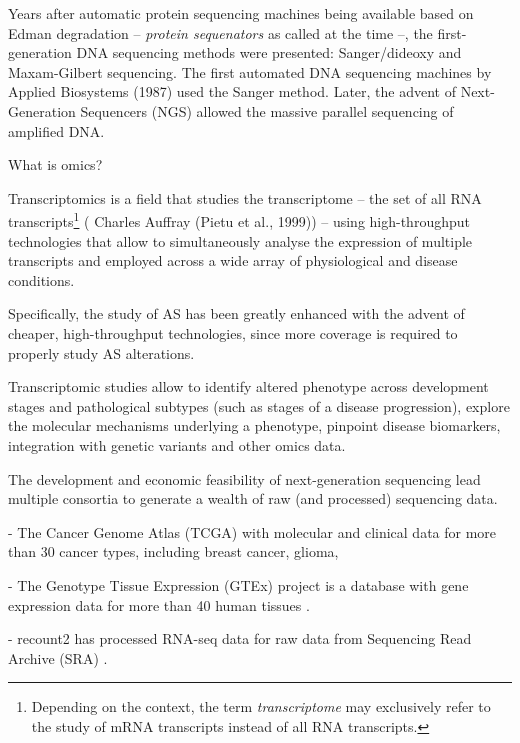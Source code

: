 Years after automatic protein sequencing machines being available based on Edman degradation -- \emph{protein sequenators} as called at the time --, the first-generation DNA sequencing methods were presented: Sanger/dideoxy and Maxam-Gilbert sequencing. %
The first automated DNA sequencing machines by Applied Biosystems (1987) used the Sanger method. Later, the advent of Next-Generation Sequencers (NGS) allowed the massive parallel sequencing of amplified DNA.


What is omics? %

Transcriptomics is a field that studies the transcriptome -- the set of all RNA transcripts\footnote{Depending on the context, the term \emph{transcriptome} may exclusively refer to the study of mRNA transcripts instead of all RNA transcripts.} ( Charles Auffray (Pietu et al., 1999)) -- using high-throughput technologies that allow to simultaneously analyse the expression of multiple transcripts and employed across a wide array of physiological and disease conditions.

Specifically, the study of AS has been greatly enhanced with the advent of cheaper, high-throughput technologies, since more coverage is required to properly study AS alterations.

Transcriptomic studies allow to identify altered phenotype across development stages and pathological subtypes (such as stages of a disease progression), explore the molecular mechanisms underlying a phenotype, pinpoint disease biomarkers, integration with genetic variants and other omics data.

The development and economic feasibility of next-generation sequencing lead multiple consortia to generate a wealth of raw (and processed) sequencing data.

- The Cancer Genome Atlas (TCGA) with molecular and clinical data for more than 30 cancer types, including breast cancer, glioma, 

- The Genotype Tissue Expression (GTEx) project is a database with gene expression data for more than 40 human tissues \cite{lonsdale:2013uo}.

- recount2 has processed RNA-seq data for raw data from Sequencing Read Archive (SRA) \cite{collado-torres:2017uw}.

